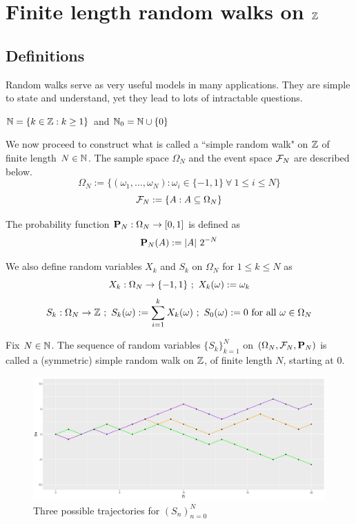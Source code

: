 \documentclass[main]{subfiles}
\begin{document}
\chapter{Finite length random walks on $\Z$} %
\setcounter{section}{0}


\vspace{-0.75cm}
\section{Definitions}

Random walks serve as very useful models in many applications. They are simple to state and understand, yet they lead to lots of intractable questions.\\

\begin{notation}
    $ \N=\{k\in\Z:k\ge 1\} $ and $ \N_{0}=\N \cup \{0\} $\\
\end{notation}
We now proceed to construct what is called a ``simple random walk" on $ \Z $ of finite length $ N\in\N $.
The sample space $ \Omega_N $ and the event space $ \SF_N $ are described below.
$$ \Omega_N:=\{(\omega_1,\ldots,\omega_N):\omega_i\in\{-1,1\}\ \forall\ 1\le i\le N\} $$
$$ \SF_N:=\{A:A\subseteq \Omega_N\} $$

The probability function $ \P_N:\Omega_N\to [0,1] $ is defined as
$$ \P_N(A):=\lvert A\rvert\ 2^{-N} $$

We also define random variables $ X_k $ and $ S_k $ on $ \Omega_N $ for $ 1\le k\le N $ as
$$ X_k:\Omega_N\to\{-1,1\}\lb X_k(\omega):=\omega_k$$
$$ S_k:\Omega_N\to\Z\lb S_k(\omega):=\sum_{i=1}^kX_k(\omega)\lb S_0(\omega):=0 \text{ for all } \omega\in\Omega_N$$
\begin{definition}
    Fix $ N\in\N $. The sequence of random variables $ \{S_k\}_{k=1}^N $ on $ (\Omega_N,\SF_N, \P_N) $ is called a (symmetric) simple random walk on $\Z$, of finite length $ N $, starting at $ 0 $.
\end{definition}

\begin{figure}[H]
    \centering
    \caption{Three possible trajectories for $(S_{n})_{n=0}^{N}$}
    \includegraphics{threerw.png}
\end{figure}
\end{document}

